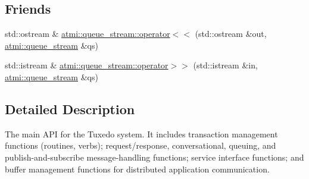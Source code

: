 \subsection*{Friends}
\begin{DoxyCompactItemize}
\item 
std\+::ostream \& \hyperlink{group__atmi_gad6b5307aa800c7d26a1241c7789dff9c}{atmi\+::queue\+\_\+stream\+::operator$<$$<$} (std\+::ostream \&out, \hyperlink{classatmi_1_1queue__stream}{atmi\+::queue\+\_\+stream} \&qs)
\item 
std\+::istream \& \hyperlink{group__atmi_gad4508b00249c5b2d93ab08550436ab4e}{atmi\+::queue\+\_\+stream\+::operator$>$$>$} (std\+::istream \&in, \hyperlink{classatmi_1_1queue__stream}{atmi\+::queue\+\_\+stream} \&qs)
\end{DoxyCompactItemize}


\subsection{Detailed Description}
The main A\+P\+I for the Tuxedo system. It includes transaction management functions (routines, verbs); request/response, conversational, queuing, and publish-\/and-\/subscribe message-\/handling functions; service interface functions; and buffer management functions for distributed application communication. 

